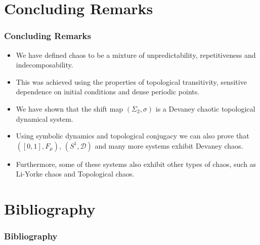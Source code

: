 \documentclass{beamer}
\begin{document}
\section{Concluding Remarks}
\begin{frame}
    \frametitle{Concluding Remarks}
    \begin{itemize}
        \item We have defined chaos to be a mixture of unpredictability, repetitiveness and indecomposability.
        \item This was achieved using the properties of topological transitivity, sensitive dependence on initial conditions and dense periodic points.
        \item We have shown that the shift map $(\Sigma_2, \sigma)$ is a Devaney chaotic topological dynamical system.
        \item Using symbolic dynamics and topological conjugacy we can also prove that $([0, 1], F_\mu)$, $(S^1, \mathcal{D})$ and many more systems exhibit Devaney chaos.
        \item Furthermore, some of these systems also exhibit other types of chaos, such as Li-Yorke chaos and Topological chaos.
    \end{itemize}
\end{frame}

\section{Bibliography}
\begin{frame}
    \frametitle{Bibliography}
    
\end{frame}
\end{document}
